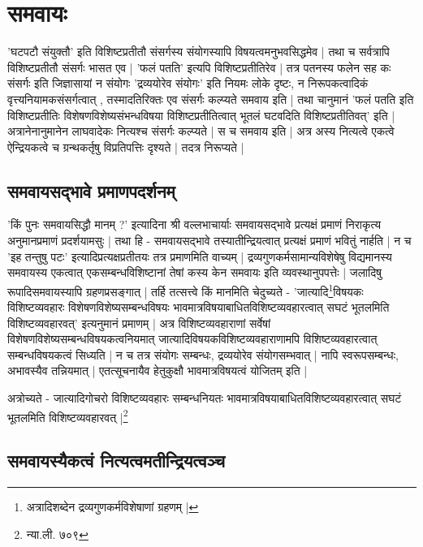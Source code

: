 \section{समवायः}


'घटपटौ संयुक्तौ' इति विशिष्टप्रतीतौ संसर्गस्य संयोगस्यापि विषयत्वमनुभवसिद्धमेव | तथा च सर्वत्रापि विशिष्टप्रतीतौ संसर्गः भासत एव | 'फलं पतति' इत्यपि विशिष्टप्रतीतिरेव | तत्र पतनस्य फलेन सह कः संसर्गः इति जिज्ञासायां न संयोगः‌ 'द्रव्ययोरेव संयोगः' इति नियमः लोके दृष्टः‌, न निरूपकत्वादिकं वृत्त्यनियामकसंसर्गत्वात् , तस्मादतिरिक्तः‌ एव संसर्गः‌ कल्प्यते समवाय इति | तथा चानुमानं 'फलं पतति इति विशिष्टप्रतीतिः‌ विशेषणविशेष्यसंभन्धविषया विशिष्टप्रतीतित्वात् भूतलं घटवदिति विशिष्टप्रतीतिवत्' इति | अत्रानेनानुमानेन लाघवादेकः‌ नित्यश्च संसर्गः कल्प्यते | स च समवाय इति | अत्र अस्य नित्यत्वे एकत्वे ऐन्द्रियकत्वे च ग्रन्थकर्तृषु विप्रतिपत्तिः दृश्यते | तदत्र निरूप्यते |

\subsection{समवायसद्भावे प्रमाणपदर्शनम्} 

'किं पुनः समवायसिद्धौ मानम् ?' इत्यादिना श्री वल्लभाचार्याः समवायसद्भावे प्रत्यक्षं प्रमाणं निराकृत्य  अनुमानप्रमाणं प्रदर्शयामसुः | तथा हि - समवायसद्भावे तस्यातीन्द्रियत्वात् प्रत्यक्षं प्रमाणं भवितुं नार्हति | न च 'इह तन्तुषु पटः' इत्यादिप्रत्यक्षप्रतीतयः तत्र प्रमाणमिति वाच्यम् | द्रव्यगुणकर्मसामान्यविशेषेषु विद्यमानस्य समवायस्य एकत्वात् एकसम्बन्धविशिष्टानां तेषां कस्य केन समवायः इति व्यवस्थानुपपत्तेः | जलादिषु रूपादिसमवायस्यापि ग्रहणप्रसङ्गात् | तर्हि तत्सत्त्वे किं मानमिति चेदुच्यते - 'जात्यादि\footnote{अत्रादिशब्देन द्रव्यगुणकर्मविशेषाणां ग्रहणम् |}विषयकः  विशिष्टव्यवहारः विशेषणविशेष्यसम्बन्धविषयः भावमात्रविषयाबाधितविशिष्टव्यवहारत्वात् सघटं भूतलमिति विशिष्टव्यवहारवत्' इत्यनुमानं प्रमाणम् | अत्र विशिष्टव्यवहाराणां सर्वेषां विशेषणविशेष्यसम्बन्धविषयकत्वनियमात् जात्यादिविषयकविशिष्टव्यवहाराणामपि विशिष्टव्यवहारत्वात् सम्बन्धविषयकत्वं सिध्यति | न च तत्र संयोगः सम्बन्धः, द्रव्ययोरेव संयोगसम्भवात् | नापि स्वरूपसम्बन्धः, अभावस्यैव तन्नियमात् | एतत्सूचनायैव हेतुकुक्षौ भावमात्रविषयत्वं योजितम् इति |

{\fontsize{11.7}{0}\selectfont\s अत्रोच्यते - जात्यादिगोचरो विशिष्टव्यवहारः सम्बन्धनियतः भावमात्रविषयाबाधितविशिष्टव्यवहारत्वात् सघटं भूतलमिति विशिष्टव्यवहारवत् |\footnote{न्या.ली. ७०९}}



\subsection{समवायस्यैकत्वं नित्यत्वमतीन्द्रियत्वञ्च} 

